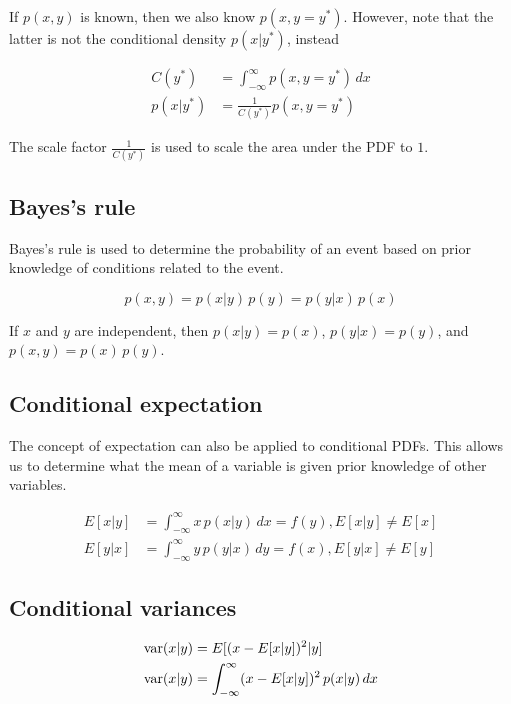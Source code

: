 If $p(x, y)$ is known, then we also know $p(x, y = y^\ast)$. However, note that
the latter is not the conditional density $p(x|y^\ast)$, instead

\begin{align*}
  C(y^\ast) &= \int_{-\infty}^\infty p(x, y = y^\ast) \,dx \\
  p(x|y^\ast) &= \frac{1}{C(y^\ast)} p(x, y = y^\ast)
\end{align*}

The scale factor $\frac{1}{C(y^\ast)}$ is used to scale the area under the PDF
to $1$.

\subsection{Bayes's rule}

Bayes's rule is used to determine the probability of an event based on prior
knowledge of conditions related to the event.

\begin{equation*}
  p(x, y) = p(x|y) \,p(y) = p(y|x) \,p(x)
\end{equation*}

If $x$ and $y$ are independent, then $p(x|y) = p(x)$, $p(y|x) = p(y)$, and
$p(x, y) = p(x) \,p(y)$.

\subsection{Conditional expectation}

The concept of expectation can also be applied to conditional PDFs. This allows
us to determine what the mean of a variable is given prior knowledge of other
variables.

\begin{align*}
  E[x|y] &= \int_{-\infty}^\infty x \,p(x|y) \,dx = f(y), E[x|y] \neq E[x] \\
  E[y|x] &= \int_{-\infty}^\infty y \,p(y|x) \,dy = f(x), E[y|x] \neq E[y]
\end{align*}

\subsection{Conditional variances}

\begin{align*}
  \operatorname{var}(x|y) &= E[(x - E[x|y])^2|y] \\
  \operatorname{var}(x|y) &= \int_{-\infty}^\infty (x - E[x|y])^2 \,p(x|y) \,dx
\end{align*}

